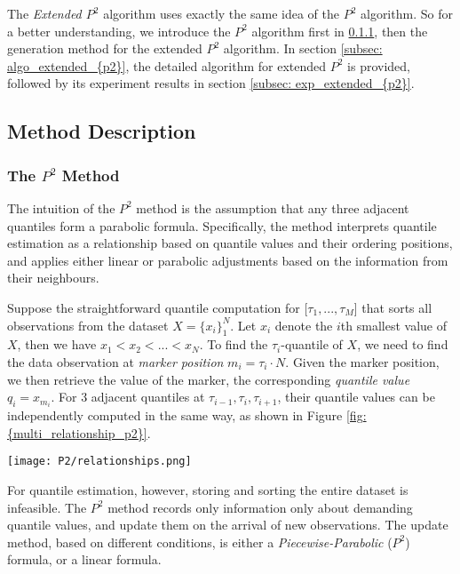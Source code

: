 The \textit{Extended $P^2$} algorithm\cite{raatikainenSequentialProcedureSimultaneous1993} uses exactly the same idea of the $P^2$ algorithm\cite{jainP2AlgorithmDynamic1985}. So for a better understanding, we introduce the $P^2$ algorithm first in \ref{subsubsec: description_{p2}}, then the generation method for the extended $P^2$ algorithm.
In section \ref{subsec: algo_extended_{p2}}, the detailed algorithm for extended $P^2$ is provided, followed by its experiment results in section \ref{subsec: exp_extended_{p2}}.

\subsection{Method Description}

\subsubsection{The $P^2$ Method}
\label{subsubsec: description_{p2}}

The intuition of the $P^2$ method is the assumption that any three adjacent quantiles form a parabolic formula.
Specifically, the method interprets quantile estimation as a relationship based on quantile values and their ordering positions, and applies either linear or parabolic adjustments based on the information from their neighbours.

Suppose the straightforward quantile computation for [$\tau_1, ..., \tau_M$] that sorts all observations from the dataset $X = \{x_i\}^N_1$. Let $x_i$ denote the $i$th smallest value of $X$, then we have $x_1 < x_2 < ... < x_N$. 
To find the $\tau_i$-quantile of $X$, we need to find the data observation at \textit{marker position} $m_i = \tau_i \cdot N$. Given the marker position, we then retrieve the value of the marker, the corresponding \textit{quantile value} $q_i = x_{m_i}$. 
For 3 adjacent quantiles at $\tau_{i-1}, \tau_i, \tau_{i+1}$, their quantile values can be independently computed in the same way, as shown in Figure \ref{fig: {multi_relationship_p2}}.

\begin{figure*}[h!]
	\texttt{[image: P2/relationships.png]}
    \caption{Relationship between $\tau$ value, marker position and quantile values correspondingly for 3 adjacent quantiles}
    \label{fig: {multi_relationship_p2}}
\end{figure*}

For quantile estimation, however, storing and sorting the entire dataset is infeasible. The $P^2$ method records only information only about demanding quantile values, and update them on the arrival of new observations. The update method, based on different conditions, is either a \textit{Piecewise-Parabolic} ($P^2$) formula, or a linear formula.

